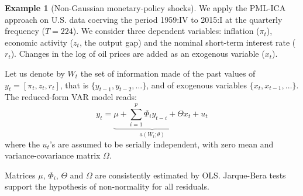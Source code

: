 \documentclass[
  11pt,
]{book}
\newenvironment{Shaded}{\begin{snugshade}}{\end{snugshade}}
\newcommand{\DecValTok}[1]{\textcolor[rgb]{0.00,0.00,0.81}{#1}}
\newcommand{\FunctionTok}[1]{\textcolor[rgb]{0.13,0.29,0.53}{\textbf{#1}}}
\newcommand{\NormalTok}[1]{#1}
\newcommand{\OtherTok}[1]{\textcolor[rgb]{0.56,0.35,0.01}{#1}}
\newcommand{\SpecialCharTok}[1]{\textcolor[rgb]{0.81,0.36,0.00}{\textbf{#1}}}
\newcommand{\StringTok}[1]{\textcolor[rgb]{0.31,0.60,0.02}{#1}}
\theoremstyle{definition}
\theoremstyle{definition}
\newtheorem{example}{Example}[chapter]
\theoremstyle{definition}
\theoremstyle{definition}
\theoremstyle{remark}
\begin{document}
\begin{example}[Non-Gaussian monetary-policy shocks]
\protect\hypertarget{exm:GMR2017}{}\label{exm:GMR2017}We apply the PML-ICA approach on U.S. data coerving the period 1959:IV to 2015:I at the quarterly frequency (\(T=224\)). We consider three dependent variables: inflation (\(\pi_t\)), economic activity (\(z_t\), the output gap) and the nominal short-term interest rate (\(r_t\)). Changes in the log of oil prices are added as an exogenous variable (\(x_t\)).

\begin{Shaded}
\end{Shaded}

Let us denote by \(W_t\) the set of information made of the past values of \(y_t= [\pi_t,z_t,r_t]\), that is \(\{y_{t-1},y_{t-2},\dots\}\), and of exogenous variables \(\{x_{t},x_{t-1},\dots\}\). The reduced-form VAR model reads:
\[
y_t  = \underbrace{\mu + \sum_{i=1}^{p} \Phi_i y_{t-i} + \Theta x_t}_{a(W_t;\theta)} + u_t
\]
where the \(u_t\)'s are assumed to be serially independent, with zero mean and variance-covariance matrix \(\Omega\).

Matrices \(\mu\), \(\Phi_i\), \(\Theta\) and \(\Omega\) are consistently estimated by OLS. Jarque-Bera tests support the hypothesis of non-normality for all residuals.


\end{example}
\end{document}
